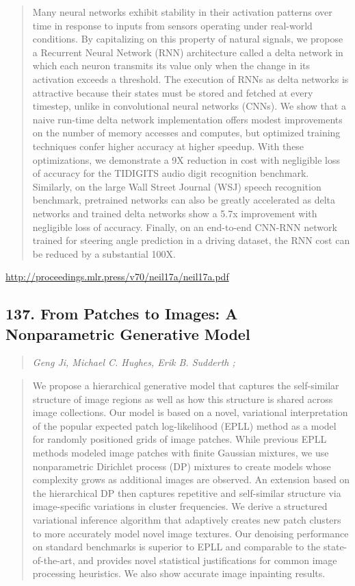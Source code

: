 \documentclass{article}
\begin{document}
\begin{quote}
    Many neural networks exhibit stability in their activation patterns over time in response to inputs from sensors operating under real-world conditions. By capitalizing on this property of natural signals, we propose a Recurrent Neural Network (RNN) architecture called a delta network in which each neuron transmits its value only when the change in its activation exceeds a threshold. The execution of RNNs as delta networks is attractive because their states must be stored and fetched at every timestep, unlike in convolutional neural networks (CNNs). We show that a naive run-time delta network implementation offers modest improvements on the number of memory accesses and computes, but optimized training techniques confer higher accuracy at higher speedup. With these optimizations, we demonstrate a 9X reduction in cost with negligible loss of accuracy for the TIDIGITS audio digit recognition benchmark. Similarly, on the large Wall Street Journal (WSJ) speech recognition benchmark, pretrained networks can also be greatly accelerated as delta networks and trained delta networks show a 5.7x improvement with negligible loss of accuracy. Finally, on an end-to-end CNN-RNN network trained for steering angle prediction in a driving dataset, the RNN cost can be reduced by a substantial 100X.  \end{quote}

\href{http://proceedings.mlr.press/v70/neil17a/neil17a.pdf}{http://proceedings.mlr.press/v70/neil17a/neil17a.pdf}

\subsection{137. From Patches to Images: A Nonparametric Generative Model}

\begin{quote}
\footnotesize{\textit{Geng Ji, Michael C. Hughes, Erik B. Sudderth ;}}
\end{quote}

\begin{quote}
    We propose a hierarchical generative model that captures the self-similar structure of image regions as well as how this structure is shared across image collections. Our model is based on a novel, variational interpretation of the popular expected patch log-likelihood (EPLL) method as a model for randomly positioned grids of image patches. While previous EPLL methods modeled image patches with finite Gaussian mixtures, we use nonparametric Dirichlet process (DP) mixtures to create models whose complexity grows as additional images are observed. An extension based on the hierarchical DP then captures repetitive and self-similar structure via image-specific variations in cluster frequencies. We derive a structured variational inference algorithm that adaptively creates new patch clusters to more accurately model novel image textures. Our denoising performance on standard benchmarks is superior to EPLL and comparable to the state-of-the-art, and provides novel statistical justifications for common image processing heuristics. We also show accurate image inpainting results.  \end{quote}
\end{document}
